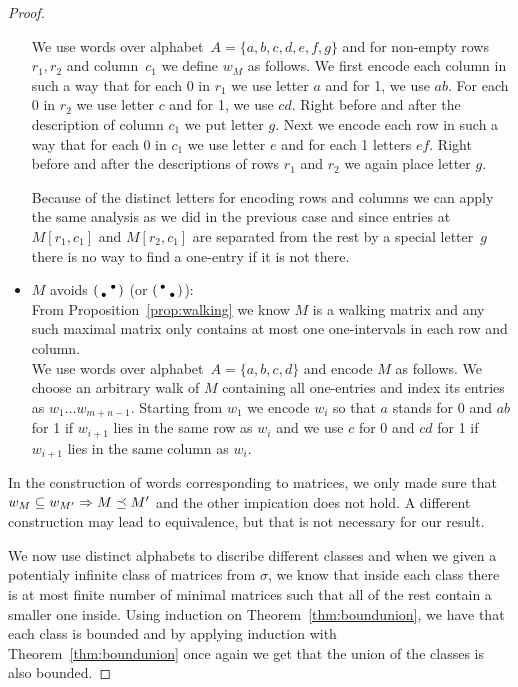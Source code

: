 \begin{proof}
\begin{itemize}
		We use words over alphabet~$A=\{a,b,c,d,e,f,g\}$ and for non-empty rows~$r_1,r_2$ and column~$c_1$ we define $w_M$ as follows. We first encode each column in such a way that for each 0 in $r_1$ we use letter $a$ and for 1, we use $ab$. For each 0 in $r_2$ we use letter $c$ and for 1, we use $cd$. Right before and after the description of column $c_1$ we put letter $g$. Next we encode each row in such a way that for each 0 in $c_1$ we use letter $e$ and for each 1 letters $ef$. Right before and after the descriptions of rows $r_1$ and $r_2$ we again place letter $g$.
		
		Because of the distinct letters for encoding rows and columns we can apply the same analysis as we did in the previous case and since entries at $M[r_1,c_1]$ and $M[r_2,c_1]$ are separated from the rest by a special letter~$g$ there is no way to find a one-entry if it is not there.
	\item $M$ avoids $\left(\begin{smallmatrix} &\bullet\\\bullet& \end{smallmatrix}\right)$ (or $\left(\begin{smallmatrix}\bullet& \\ &\bullet\end{smallmatrix}\right)$):\\
		From Proposition~\ref{prop:walking} we know $M$ is a walking matrix and any such maximal matrix only contains at most one one-intervals in each row and column.\\
		
		We use words over alphabet~$A=\{a,b,c,d\}$ and encode $M$ as follows. We choose an arbitrary walk of $M$ containing all one-entries and index its entries as $w_1\dots w_{m+n-1}$. Starting from $w_1$ we encode $w_i$ so that $a$ stands for 0 and $ab$ for 1 if $w_{i+1}$ lies in the same row as $w_i$ and we use $c$ for 0 and $cd$ for 1 if $w_{i+1}$ lies in the same column as $w_i$.
\end{itemize}

In the construction of words corresponding to matrices, we only made sure that $w_M\subseteq w_{M'}\Rightarrow M\preceq M'$ and the other impication does not hold. A different construction may lead to equivalence, but that is not necessary for our result.

We now use distinct alphabets to discribe different classes and when we given a potentialy infinite class of matrices from $\sigma$, we know that inside each class there is at most finite number of minimal matrices such that all of the rest contain a smaller one inside. Using induction on Theorem~\ref{thm:boundunion}, we have that each class is bounded and by applying induction with Theorem~\ref{thm:boundunion} once again we get that the union of the classes is also bounded.
\end{proof}


